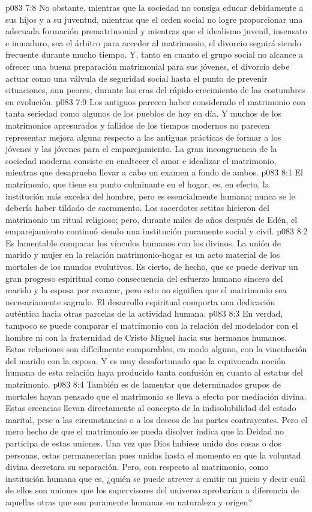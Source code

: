 \vs p083 7:8 No obstante, mientras que la sociedad no consiga educar debidamente a sus hijos y a su juventud, mientras que el orden social no logre proporcionar una adecuada formación prematrimonial y mientras que el idealismo juvenil, insensato e inmaduro, sea el árbitro para acceder al matrimonio, el divorcio seguirá siendo frecuente durante mucho tiempo. Y, tanto en cuanto el grupo social no alcance a ofrecer una buena preparación matrimonial para sus jóvenes, el divorcio debe actuar como una válvula de seguridad social hasta el punto de prevenir situaciones, aun peores, durante las eras del rápido crecimiento de las costumbres en evolución.
\vs p083 7:9 \pc Los antiguos parecen haber considerado el matrimonio con tanta seriedad como algunos de los pueblos de hoy en día. Y muchos de los matrimonios apresurados y fallidos de los tiempos modernos no parecen representar mejora alguna respecto a las antiguas prácticas de formar a los jóvenes y las jóvenes para el emparejamiento. La gran incongruencia de la sociedad moderna consiste en enaltecer el amor e idealizar el matrimonio, mientras que desaprueba llevar a cabo un examen a fondo de ambos.
\vs p083 8:1 El matrimonio, que tiene su punto culminante en el hogar, es, en efecto, la institución más excelsa del hombre, pero es esencialmente humana; nunca se le debería haber tildado de sacramento. Los sacerdotes setitas hicieron del matrimonio un ritual religioso; pero, durante miles de años después de Edén, el emparejamiento continuó siendo una institución puramente social y civil.
\vs p083 8:2 Es lamentable comparar los vínculos humanos con los divinos. La unión de marido y mujer en la relación matrimonio\hyp{}hogar es un acto material de los mortales de los mundos evolutivos. Es cierto, de hecho, que se puede derivar un gran progreso espiritual como consecuencia del esfuerzo humano sincero del marido y la esposa por avanzar, pero esto no significa que el matrimonio sea necesariamente sagrado. El desarrollo espiritual comporta una dedicación auténtica hacia otras parcelas de la actividad humana.
\vs p083 8:3 En verdad, tampoco se puede comparar el matrimonio con la relación del modelador con el hombre ni con la fraternidad de Cristo Miguel hacia sus hermanos humanos. Estas relaciones son difícilmente comparables, en modo alguno, con la vinculación del marido con la esposa. Y es muy desafortunado que la equivocada noción humana de esta relación haya producido tanta confusión en cuanto al estatus del matrimonio.
\vs p083 8:4 También es de lamentar que determinados grupos de mortales hayan pensado que el matrimonio se lleva a efecto por mediación divina. Estas creencias llevan directamente al concepto de la indisolubilidad del estado marital, pese a las circunstancias o a los deseos de las partes contrayentes. Pero el mero hecho de que el matrimonio se pueda disolver indica que la Deidad no participa de estas uniones. Una vez que Dios hubiese unido dos cosas o dos personas, estas permanecerían pues unidas hasta el momento en que la voluntad divina decretara su separación. Pero, con respecto al matrimonio, como institución humana que es, ¿quién se puede atrever a emitir un juicio y decir cuál de ellos son uniones que los supervisores del universo aprobarían a diferencia de aquellas otras que son puramente humanas en naturaleza y origen?
